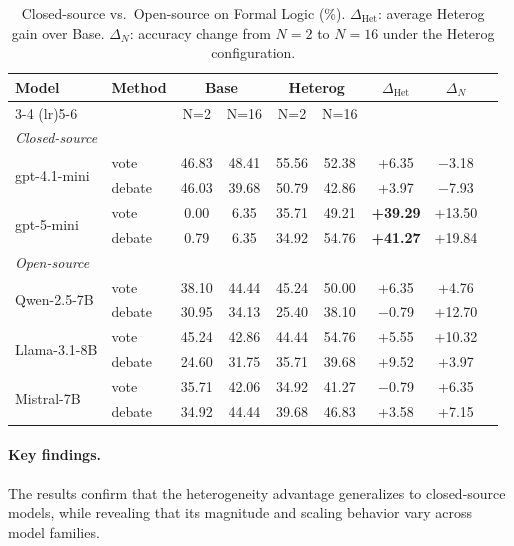 \documentclass{article}
\theoremstyle{plain}
\theoremstyle{definition}
\theoremstyle{remark}
\begin{document}
\begin{table}[t]
\centering
\caption{Closed-source vs.\ Open-source on Formal Logic (\%). $\Delta_\text{Het}$: average Heterog gain over Base. $\Delta_N$: accuracy change from $N\!=\!2$ to $N\!=\!16$ under the Heterog configuration.}
\label{tab:closed_source_comparison}
\footnotesize
\setlength{\tabcolsep}{7pt} %
\begin{tabular}{llccccccc}
\toprule
\multirow{2}{*}{\textbf{Model}} & \multirow{2}{*}{\textbf{Method}} & \multicolumn{2}{c}{\textbf{Base}} & \multicolumn{2}{c}{\textbf{Heterog}} & \multirow{2}{*}{\textbf{$\Delta_\text{Het}$}} & \multirow{2}{*}{\textbf{$\Delta_N$}} \\
\cmidrule(lr){3-4} \cmidrule(lr){5-6}
 &  & N=2 & N=16 & N=2 & N=16 &  &  \\
\midrule
\multicolumn{8}{l}{\textit{Closed-source}} \\
\midrule
\multirow{2}{*}{gpt-4.1-mini}
 & vote   & 46.83 & 48.41 & 55.56 & 52.38 & +6.35  & $-$3.18 \\
 & debate & 46.03 & 39.68 & 50.79 & 42.86 & +3.97  & $-$7.93 \\
\midrule
\multirow{2}{*}{gpt-5-mini}
 & vote   & 0.00  & 6.35  & 35.71 & 49.21 & \textbf{+39.29} & +13.50 \\
 & debate & 0.79  & 6.35  & 34.92 & 54.76 & \textbf{+41.27} & +19.84 \\
\midrule
\multicolumn{8}{l}{\textit{Open-source}} \\
\midrule
\multirow{2}{*}{Qwen-2.5-7B}
 & vote   & 38.10 & 44.44 & 45.24 & 50.00 & +6.35  & +4.76 \\
 & debate & 30.95 & 34.13 & 25.40 & 38.10 & $-$0.79 & +12.70 \\
\midrule
\multirow{2}{*}{Llama-3.1-8B}
 & vote   & 45.24 & 42.86 & 44.44 & 54.76 & +5.55  & +10.32 \\
 & debate & 24.60 & 31.75 & 35.71 & 39.68 & +9.52  & +3.97 \\
\midrule
\multirow{2}{*}{Mistral-7B}
 & vote   & 35.71 & 42.06 & 34.92 & 41.27 & $-$0.79 & +6.35 \\
 & debate & 34.92 & 44.44 & 39.68 & 46.83 & +3.58  & +7.15 \\
\bottomrule
\end{tabular}%
\end{table}




\paragraph{Key findings.}
The results confirm that the heterogeneity advantage generalizes to closed-source models, while revealing that its magnitude and scaling behavior vary across model families.
\end{document}
